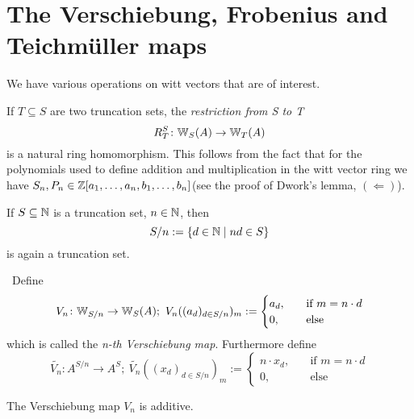 \section{The Verschiebung, Frobenius and Teichmüller maps}
We have various operations on witt vectors that are of interest.
\begin{definition}
    If $T \subseteq S$ are two truncation sets, the \textit{restriction from S to T}
    \[
      R_T^S \colon \mathbb{W}_S(A) \to \mathbb{W}_T(A)  
    \]
    is a natural ring homomorphism. This follows from the fact that
    for the polynomials used to define addition and multiplication in the witt vector ring
    we have $S_n,P_n \in \mathbb{Z}[a_1,\dots,a_n,b_1,\dots,b_n]$(see the proof of Dwork's lemma, $(\Leftarrow)$).
\end{definition}
If $S\subseteq \mathbb{N}$ is a truncation set, $n \in \mathbb{N}$, then
\[
   S/n := \{d \in \mathbb{N} \mid nd \in S\}
\]
is again a truncation set.
\begin{definition}[Verschiebung] \
    Define 
    \[
        V_n \colon \mathbb{W}_{S/n} \to \mathbb{W}_S(A);\  
        V_n((a_d)_{d \in S/n})_m := 
        \begin{cases}
            a_d, &\quad \text{if $m=n \cdot d$} \\
            0,  &\quad \text{else}
        \end{cases}
    \]
    which is called the \textit{n-th Verschiebung map}. Furthermore define
    \[
        \widetilde{V_n} \colon A^{S/n} \to A^S;\ 
        \widetilde{V_n}((x_d)_{d \in S/n})_m := 
        \begin{cases}
            n \cdot x_d, &\quad \text{if $m=n \cdot d$} \\
            0,  &\quad \text{else}
        \end{cases}
    \]
\end{definition}
\begin{lemma} \label{lem: verschiebung is additive}
    The Verschiebung map $V_n$ is additive.
\end{lemma}
